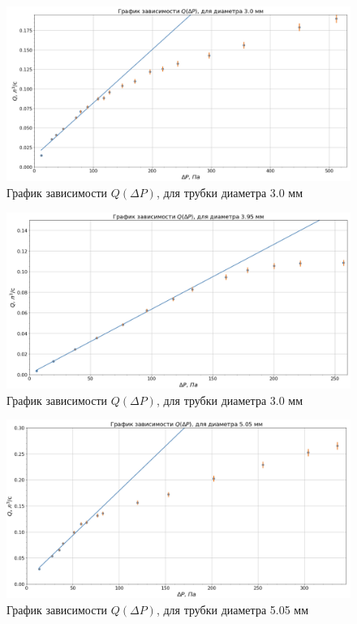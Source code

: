 \documentclass[a4paper,12pt]{article}
\theoremstyle{definition}
\begin{document}
	\begin{figure}[H]
		\centering
		\includegraphics[scale = 0.5]{3.00}
		\caption{График зависимости $Q(\Delta P)$, для трубки диаметра 3.0 мм}
		\label{graph1}
	\end{figure}
	\begin{figure}[H]
		\centering
		\includegraphics[scale = 0.55]{3.95}
		\caption{График зависимости $Q(\Delta P)$, для трубки диаметра 3.0 мм}
		\label{graph2}
	\end{figure}
	\begin{figure}[H]
		\centering
		\includegraphics[scale = 0.55]{5.05}
		\caption{График зависимости $Q(\Delta P)$, для трубки диаметра 5.05 мм}
		\label{graph3}
	\end{figure}
\end{document}
